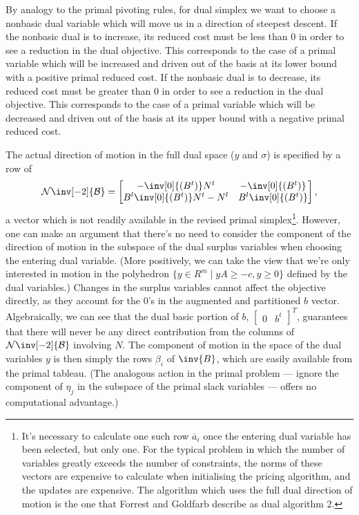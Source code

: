 By analogy to the primal pivoting rules, for dual simplex
we want to choose a nonbasic dual variable which will move us in a direction
of steepest descent.
If the nonbasic dual is to increase, its reduced cost must be less than 0 in
order to see a reduction in the dual objective.
This corresponds to the case of a primal variable which will be increased and
driven out of the basis at its lower bound with a positive primal reduced
cost.
If the nonbasic dual is to decrease, its reduced cost must be greater than
0 in order to see a reduction in the dual objective.
This corresponds to the case of a primal variable which will be decreased and
driven out of the basis at its upper bound with a negative primal reduced cost.

The actual direction of motion in the full dual space ($y$ and $\sigma$) is
specified by a row of
\begin{equation*}
\mathcal{N}\inv[-2]{\mathcal{B}} = \begin{bmatrix}
			-\inv[0]{(B^t)} N^t & -\inv[0]{(B^t)} \\
			B^l\inv[0]{(B^t)} N^t - N^l & B^l\inv[0]{(B^t)}
		      \end{bmatrix},
\end{equation*}
a vector which is not readily available in the revised
primal simplex\footnote{%
It's necessary to calculate one such row $\overline{a}_i$ once the entering
dual variable has been selected, but only one.
For the typical problem in which the number of variables greatly
exceeds the number of constraints, the norms of these vectors are expensive to
calculate when initialising the pricing algorithm, and the updates are
expensive.
The algorithm which uses the full dual direction of motion is the one that
Forrest and Goldfarb describe as dual algorithm 2.}.
However, one can make an argument that there's no need to consider the
component of the direction of motion in the subspace of the dual surplus
variables when choosing the entering dual variable.
(More positively, we can take the view that we're only interested in motion
in the polyhedron $\{y \in R^m \mid yA \geq -c, y \geq 0\}$ defined by the
dual variables.)
Changes in the surplus variables cannot affect the objective directly, as
they account for the 0's in the augmented and partitioned $b$ vector.
Algebraically, we can see that the dual basic portion
of $b$, $\begin{bmatrix}0 & b^t \end{bmatrix}^T$, guarantees that there will
never be any direct contribution from the columns
of $\mathcal{N}\inv[-2]{\mathcal{B}}$ involving $N$.
The component of motion in the space of the dual variables $y$ is then simply
the rows $\beta_i$ of $\inv{B}$, which are easily available from the primal
tableau.
(The analogous action in the primal problem --- ignore the component of
$\eta_j$ in the subspace of the primal slack variables --- offers no
computational advantage.)

